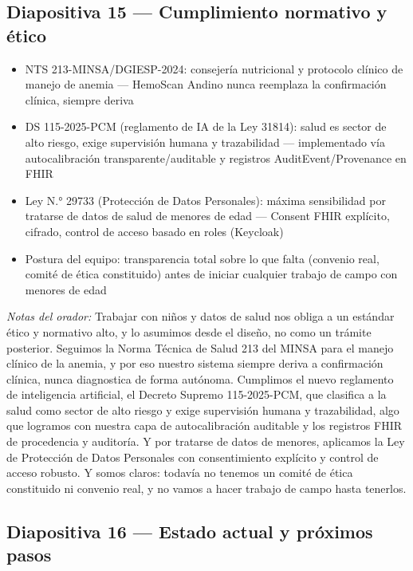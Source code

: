 \documentclass[11pt,a4paper]{article}
\providecommand{\tightlist}{%
  \setlength{\itemsep}{0pt}\setlength{\parskip}{0pt}}
\begin{document}
\subsection{Diapositiva 15 --- Cumplimiento normativo y ético}\label{diapositiva-15-cumplimiento-normativo-y-uxe9tico}

\begin{itemize}
\tightlist
\item
  NTS 213-MINSA/DGIESP-2024: consejería nutricional y protocolo clínico de manejo de anemia --- HemoScan Andino nunca reemplaza la confirmación clínica, siempre deriva
\item
  DS 115-2025-PCM (reglamento de IA de la Ley 31814): salud es sector de alto riesgo, exige supervisión humana y trazabilidad --- implementado vía autocalibración transparente/auditable y registros AuditEvent/Provenance en FHIR
\item
  Ley N.° 29733 (Protección de Datos Personales): máxima sensibilidad por tratarse de datos de salud de menores de edad --- Consent FHIR explícito, cifrado, control de acceso basado en roles (Keycloak)
\item
  Postura del equipo: transparencia total sobre lo que falta (convenio real, comité de ética constituido) antes de iniciar cualquier trabajo de campo con menores de edad
\end{itemize}

\emph{Notas del orador:} Trabajar con niños y datos de salud nos obliga a un estándar ético y normativo alto, y lo asumimos desde el diseño, no como un trámite posterior. Seguimos la Norma Técnica de Salud 213 del MINSA para el manejo clínico de la anemia, y por eso nuestro sistema siempre deriva a confirmación clínica, nunca diagnostica de forma autónoma. Cumplimos el nuevo reglamento de inteligencia artificial, el Decreto Supremo 115-2025-PCM, que clasifica a la salud como sector de alto riesgo y exige supervisión humana y trazabilidad, algo que logramos con nuestra capa de autocalibración auditable y los registros FHIR de procedencia y auditoría. Y por tratarse de datos de menores, aplicamos la Ley de Protección de Datos Personales con consentimiento explícito y control de acceso robusto. Y somos claros: todavía no tenemos un comité de ética constituido ni convenio real, y no vamos a hacer trabajo de campo hasta tenerlos.

\subsection{Diapositiva 16 --- Estado actual y próximos pasos}\label{diapositiva-16-estado-actual-y-pruxf3ximos-pasos}
\end{document}
